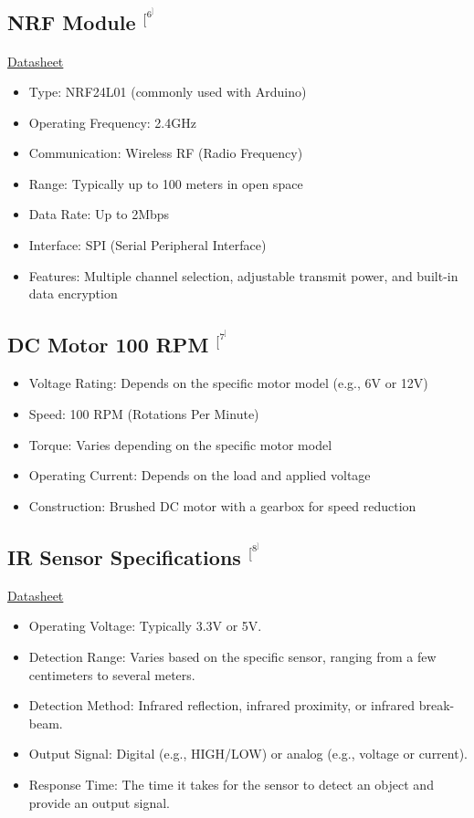 \documentclass[a4paper,12pt,oneside]{book}
\begin{document}
\subsection*{NRF Module $^[^6^]$}
\href{https://pdf1.alldatasheet.com/datasheet-pdf/view/1243924/ETC1/NRF24L01.html}{Datasheet}
\begin{itemize}
  \item Type: NRF24L01 (commonly used with Arduino)
  \item Operating Frequency: 2.4GHz
  \item Communication: Wireless RF (Radio Frequency)
  \item Range: Typically up to 100 meters in open space
  \item Data Rate: Up to 2Mbps
  \item Interface: SPI (Serial Peripheral Interface)
  \item Features: Multiple channel selection, adjustable transmit power, and built-in data encryption
\end{itemize}

\subsection*{DC Motor 100 RPM $^[^7^]$}
\begin{itemize}
  \item Voltage Rating: Depends on the specific motor model (e.g., 6V or 12V)
  \item Speed: 100 RPM (Rotations Per Minute)
  \item Torque: Varies depending on the specific motor model
  \item Operating Current: Depends on the load and applied voltage
  \item Construction: Brushed DC motor with a gearbox for speed reduction
\end{itemize}

\subsection*{IR Sensor Specifications $^[^8^]$}
\href{https://www.google.com/url?sa=t&source=web&rct=j&opi=89978449&url=https://cdn.instructables.com/ORIG/FW9/SBS0/J3EPQTB8/FW9SBS0J3EPQTB8.pdf&ved=2ahUKEwj4z5KRu5WAAxXGcvUHHRNqBvUQFnoECCIQAQ&usg=AOvVaw0fzUYFnhjSwvZjJWBmqQ7_}{Datasheet}
\begin{itemize}
  \item Operating Voltage: Typically 3.3V or 5V.
  \item Detection Range: Varies based on the specific sensor, ranging from a few centimeters to several meters.
  \item Detection Method: Infrared reflection, infrared proximity, or infrared break-beam.
  \item Output Signal: Digital (e.g., HIGH/LOW) or analog (e.g., voltage or current).
  \item Response Time: The time it takes for the sensor to detect an object and provide an output signal.
\end{itemize}
\end{document}
